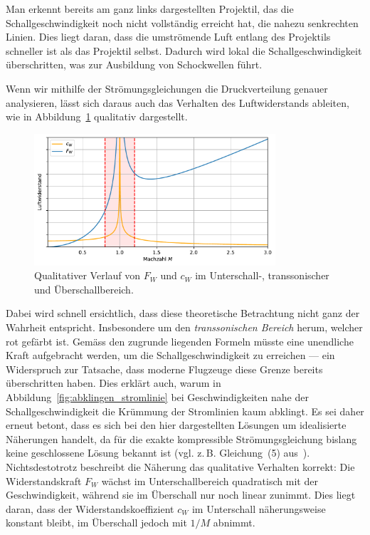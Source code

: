 Man erkennt bereits am ganz links dargestellten Projektil, 
das die Schallgeschwindigkeit noch nicht vollständig 
erreicht hat, die nahezu senkrechten Linien. 
Dies liegt daran, dass die umströmende Luft entlang 
des Projektils schneller ist als das Projektil selbst. 
Dadurch wird lokal die Schallgeschwindigkeit überschritten, 
was zur Ausbildung von Schockwellen führt.

Wenn wir mithilfe der Strömungsgleichungen die Druckverteilung genauer analysieren, 
lässt sich daraus auch das Verhalten des Luftwiderstands ableiten, 
wie in Abbildung~\ref{fig:luftwiderstand} qualitativ dargestellt.
\begin{figure}
    \centering
    \includegraphics[width=0.8\textwidth]{papers/ueberschall/figures/Luftwiderstand_qual.pdf}
    \caption{Qualitativer Verlauf von $F_W$ und $c_W$ im Unterschall-, transsonischer und Überschallbereich.}
    \label{fig:luftwiderstand}
\end{figure}
Dabei wird schnell ersichtlich, dass diese theoretische 
Betrachtung nicht ganz der Wahrheit entspricht.
Insbesondere um den \emph{transsonischen Bereich} herum, welcher rot gefärbt ist.
%
Gemäss den zugrunde liegenden Formeln müsste eine 
unendliche Kraft aufgebracht werden, 
um die Schallgeschwindigkeit zu erreichen — ein Widerspruch zur Tatsache, 
dass moderne Flugzeuge diese Grenze bereits überschritten haben.
Dies erklärt auch, warum in Abbildung~\ref{fig:abklingen_stromlinie} 
bei Geschwindigkeiten nahe der Schallgeschwindigkeit die Krümmung 
der Stromlinien kaum abklingt.
Es sei daher erneut betont, dass es sich bei den hier 
dargestellten Lösungen um idealisierte Näherungen handelt,
da für die exakte kompressible Strömungsgleichung bislang 
keine geschlossene Lösung bekannt ist 
(vgl. z.\,B. Gleichung~(5) aus~\cite{Ackeret1928}).
Nichtsdestotrotz beschreibt die Näherung das qualitative Verhalten korrekt:
Die Widerstandskraft $F_W$ wächst im Unterschallbereich quadratisch mit 
der Geschwindigkeit, während sie im Überschall nur noch linear zunimmt. 
Dies liegt daran, dass der Widerstandskoeffizient $c_W$ im Unterschall 
näherungsweise konstant bleibt, im Überschall 
jedoch mit $1/M$ abnimmt.

